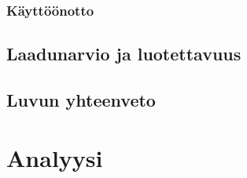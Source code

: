 \documentclass[bscthesis,finnish,oneside,biblatex]{uefcsthesis}
\begin{document}

    \subsection{Käyttöönotto}



    \section{Laadunarvio ja luotettavuus}



    \section{Luvun yhteenveto}



    \chapter{Analyysi}
    \label{cha:analyysi}




\end{document}
